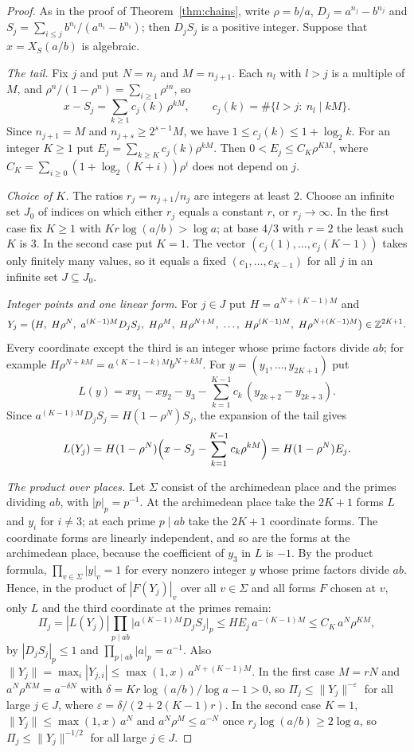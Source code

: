 \documentclass[11pt]{article}
\begin{document}
\begin{proof}
As in the proof of Theorem~\ref{thm:chains}, write $\rho=b/a$,
$D_j=a^{n_j}-b^{n_j}$ and $S_j=\sum_{i\le j}b^{n_i}/(a^{n_i}-b^{n_i})$; then
$D_jS_j$ is a positive integer. Suppose that $x=X_S(a/b)$ is algebraic.

\emph{The tail.} Fix $j$ and put $N=n_j$ and $M=n_{j+1}$. Each $n_l$ with
$l>j$ is a multiple of $M$, and $\rho^n/(1-\rho^n)=\sum_{i\ge1}\rho^{in}$, so
\[
 x-S_j=\sum_{k\ge1}c_j(k)\,\rho^{kM},\qquad c_j(k)=\#\{l>j:\ n_l\mid kM\}.
\]
Since $n_{j+1}=M$ and $n_{j+s}\ge2^{s-1}M$, we have $1\le c_j(k)\le1+\log_2k$.
For an integer $K\ge1$ put $E_j=\sum_{k\ge K}c_j(k)\rho^{kM}$. Then
$0<E_j\le C_K\rho^{KM}$, where $C_K=\sum_{i\ge0}(1+\log_2(K+i))\rho^{i}$ does
not depend on $j$.

\emph{Choice of $K$.} The ratios $r_j=n_{j+1}/n_j$ are integers at least $2$.
Choose an infinite set $J_0$ of indices on which either $r_j$ equals a
constant $r$, or $r_j\to\infty$. In the first case fix $K\ge1$ with
$Kr\log(a/b)>\log a$; at base $4/3$ with $r=2$ the least such $K$ is $3$. In the second
case put $K=1$. The vector $(c_j(1),\dots,c_j(K-1))$ takes only finitely many
values, so it equals a fixed $(c_1,\dots,c_{K-1})$ for all $j$ in an infinite
set $J\subseteq J_0$.

\emph{Integer points and one linear form.} For $j\in J$ put $H=a^{N+(K-1)M}$
and
\[
 Y_j=\bigl(H,\ H\rho^{N},\ a^{(K-1)M}D_jS_j,\ H\rho^{M},\ H\rho^{N+M},\ \dots,\
 H\rho^{(K-1)M},\ H\rho^{N+(K-1)M}\bigr)\in\Z^{2K+1}.
\]
Every coordinate except the third is an integer whose prime factors divide
$ab$; for example $H\rho^{N+kM}=a^{(K-1-k)M}b^{N+kM}$. For
$y=(y_1,\dots,y_{2K+1})$ put
\[
 L(y)=xy_1-xy_2-y_3-\sum_{k=1}^{K-1}c_k\,(y_{2k+2}-y_{2k+3}).
\]
Since $a^{(K-1)M}D_jS_j=H(1-\rho^N)S_j$, the expansion of the tail gives
\[
 L(Y_j)=H(1-\rho^N)\Bigl(x-S_j-\sum_{k=1}^{K-1}c_k\rho^{kM}\Bigr)
 =H(1-\rho^N)E_j .
\]

\emph{The product over places.} Let $\Sigma$ consist of the archimedean place
and the primes dividing $ab$, with $|p|_p=p^{-1}$. At the archimedean place
take the $2K+1$ forms $L$ and $y_i$ for $i\ne3$; at each prime $p\mid ab$ take
the $2K+1$ coordinate forms. The coordinate forms are linearly independent,
and so are the forms at the archimedean place, because the coefficient of
$y_3$ in $L$ is $-1$. By the product formula,
$\prod_{v\in\Sigma}|y|_v=1$ for every nonzero integer $y$ whose prime factors
divide $ab$. Hence, in the product of $|F(Y_j)|_v$ over all $v\in\Sigma$ and all
forms $F$ chosen at $v$, only $L$ and the third coordinate at the primes remain:
\[
 \Pi_j=|L(Y_j)|\prod_{p\mid ab}\bigl|a^{(K-1)M}D_jS_j\bigr|_p
 \le HE_j\,a^{-(K-1)M}\le C_K\,a^{N}\rho^{KM},
\]
by $|D_jS_j|_p\le1$ and $\prod_{p\mid ab}|a|_p=a^{-1}$. Also
$\|Y_j\|=\max_i|Y_{j,i}|\le\max(1,x)\,a^{N+(K-1)M}$. In the first case
$M=rN$ and $a^N\rho^{KM}=a^{-\delta N}$ with $\delta=Kr\log(a/b)/\log a-1>0$,
so $\Pi_j\le\|Y_j\|^{-\varepsilon}$ for all large $j\in J$, where
$\varepsilon=\delta/(2+2(K-1)r)$. In the second case $K=1$,
$\|Y_j\|\le\max(1,x)\,a^N$ and $a^N\rho^M\le a^{-N}$ once
$r_j\log(a/b)\ge2\log a$, so $\Pi_j\le\|Y_j\|^{-1/2}$ for all large $j\in J$.


\end{proof}
\end{document}
